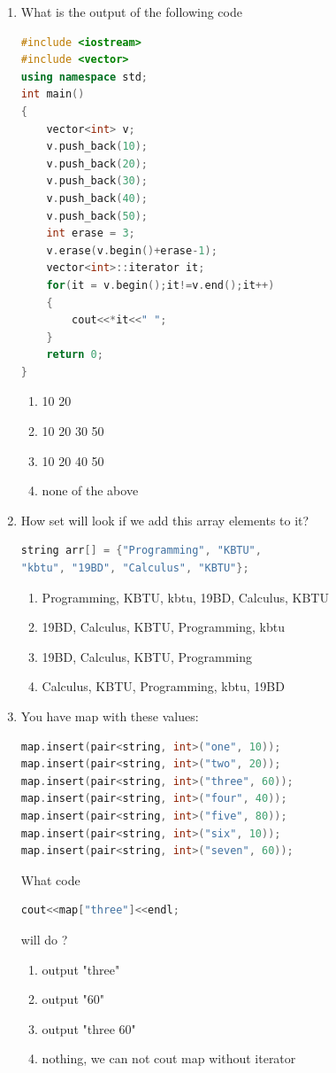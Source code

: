 \documentclass[10pt]{article}
\begin{document}
\begin{enumerate}
\item What is the output of the following code
\begin{lstlisting}[language=C++]
#include <iostream>
#include <vector>
using namespace std;
int main()
{
    vector<int> v;
    v.push_back(10);
    v.push_back(20);
    v.push_back(30);
    v.push_back(40);
    v.push_back(50);
    int erase = 3;
    v.erase(v.begin()+erase-1);
    vector<int>::iterator it;
    for(it = v.begin();it!=v.end();it++)
    {
        cout<<*it<<" ";
    }
    return 0;
}
\end{lstlisting}
\begin{multicols}{4}
\begin{enumerate}
    \item 10 20
    \item 10 20 30 50
    \item 10 20 40 50
    \item none of the above
\end{enumerate}
\end{multicols}






\item How set will look if we add this array elements to it? 
\begin{lstlisting}[language=C++]
string arr[] = {"Programming", "KBTU", 
"kbtu", "19BD", "Calculus", "KBTU"};
\end{lstlisting}
\begin{enumerate}
    \item Programming, KBTU, kbtu, 19BD, Calculus, KBTU
    \item 19BD, Calculus, KBTU, Programming, kbtu
    \item 19BD, Calculus, KBTU, Programming
    \item Calculus, KBTU, Programming, kbtu, 19BD
\end{enumerate}





\item You have map with these values:
\begin{lstlisting}[language=C++]
map.insert(pair<string, int>("one", 10));
map.insert(pair<string, int>("two", 20));
map.insert(pair<string, int>("three", 60));
map.insert(pair<string, int>("four", 40));
map.insert(pair<string, int>("five", 80));
map.insert(pair<string, int>("six", 10));
map.insert(pair<string, int>("seven", 60));
\end{lstlisting}
What code
\begin{lstlisting}[language=C++]
cout<<map["three"]<<endl; 
\end{lstlisting}
will do ?
\begin{enumerate}
    \item output "three"
    \item output "60"
    \item output "three 60"
    \item nothing, we can not cout map without iterator
\end{enumerate}




\end{enumerate}
\end{document}

